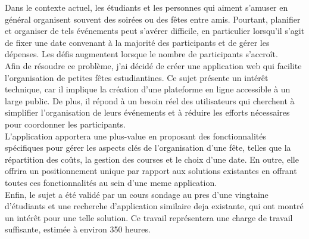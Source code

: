 Dans le contexte actuel, les étudiants et les personnes qui aiment s'amuser en général organisent souvent des soirées ou des fêtes entre amis.
Pourtant, planifier et organiser de tels événements peut s'avérer difficile, en particulier lorsqu'il s'agit de fixer une date convenant à la majorité des participants et de gérer les dépenses.
Les défis augmentent lorsque le nombre de participants s'accroît.\\

Afin de résoudre ce problème, j'ai décidé de créer une application web qui facilite l'organisation de petites fêtes estudiantines.
Ce sujet présente un intérêt technique, car il implique la création d'une plateforme en ligne accessible à un large public.
De plus, il répond à un besoin réel des utilisateurs qui cherchent à simplifier l'organisation de leurs événements et à réduire les efforts nécessaires pour coordonner les participants.\\

L'application apportera une plus-value en proposant des fonctionnalités spécifiques pour gérer les aspects clés de l'organisation d'une fête, telles que la répartition des coûts,
la gestion des courses et le choix d'une date.
En outre, elle offrira un positionnement unique par rapport aux solutions existantes en offrant toutes ces fonctionnalités au sein d'une meme application.\\

Enfin, le sujet a été validé par un cours sondage au pres d'une vingtaine d'étudiants et une recherche d'application similaire deja existante, qui ont montré un intérêt pour une telle solution.
Ce travail représentera une charge de travail suffisante, estimée à environ 350 heures.